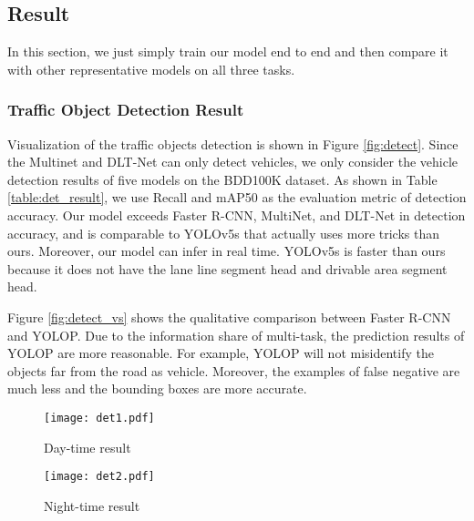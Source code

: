 \documentclass[10pt,twocolumn,letterpaper]{article}
\begin{document}
\subsection{Result}

In this section, we just simply train our model end to end and then compare it with other representative models on all three tasks. 



\subsubsection{Traffic Object Detection Result}
Visualization of the traffic objects detection is shown in Figure \ref{fig:detect}. Since the Multinet and DLT-Net can only detect vehicles, we only consider the vehicle detection results of five models on the BDD100K dataset. As shown in Table \ref{table:det_result}, we use Recall and mAP50 as the evaluation metric of detection accuracy. Our model exceeds Faster R-CNN, MultiNet, and DLT-Net in detection accuracy, and is comparable to YOLOv5s that actually uses more tricks than ours. Moreover, our model can infer in real time. YOLOv5s is faster than ours because it does not have the lane line segment head and drivable area segment head.

Figure \ref{fig:detect_vs} shows the qualitative comparison between Faster R-CNN and YOLOP. Due to the information share of multi-task, the prediction results of YOLOP are more reasonable. For example, YOLOP will not misidentify the objects far from the road as vehicle. Moreover, the examples of false negative are much less and the bounding boxes are more accurate.



\begin{figure*}
\centering
\begin{subfigure}{\linewidth}
  \texttt{[image: det1.pdf]}
  \caption{Day-time result}
\end{subfigure}

\begin{subfigure}{\linewidth}
  \texttt{[image: det2.pdf]}
  \caption{Night-time result}
\end{subfigure}
\caption{Visualization of the traffic objects detection results of YOLOP. Top Row: Traffic objects detection results in day-time scenes. Bottom row: Traffic objects detection results in night scenes.}
\label{fig:detect}
\end{figure*}
\end{document}
